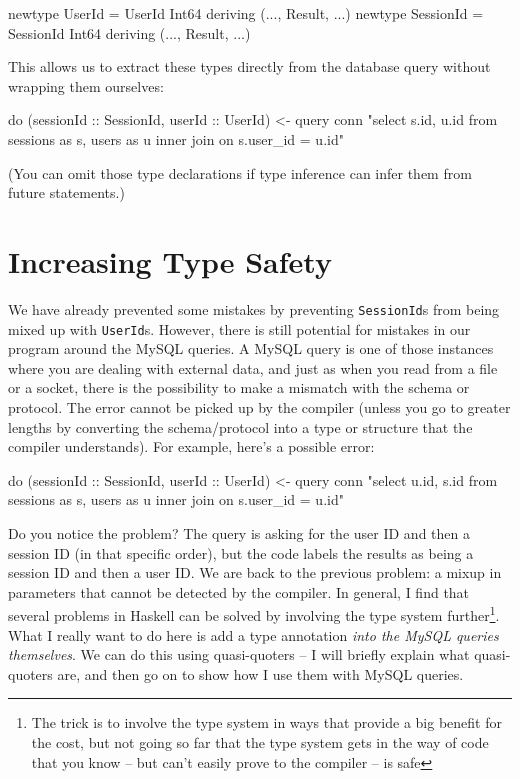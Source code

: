\documentclass{tmr}
\begin{document}
\begin{code}
newtype UserId = UserId Int64 deriving (..., Result, ...)
newtype SessionId = SessionId Int64 deriving (..., Result, ...)
\end{code}

This allows us to extract these types directly from the database query without wrapping them ourselves:

\begin{code}
do (sessionId :: SessionId, userId :: UserId) <- query conn "select
     s.id, u.id from sessions as s, users as u inner join on s.user_id = u.id"
\end{code}

(You can omit those type declarations if type inference can infer them from future statements.)

\section{Increasing Type Safety}

We have already prevented some mistakes by preventing \lstinline|SessionId|s from being mixed up with \lstinline|UserId|s.  However, there is still potential for mistakes in our program around the MySQL queries.  A MySQL query is one of those instances where you are dealing with external data, and just as when you read from a file or a socket, there is the possibility to make a mismatch with the schema or protocol.  The error cannot be picked up by the compiler (unless you go to greater lengths by converting the schema/protocol into a type or structure that the compiler understands).  For example, here's a possible error:

\begin{code}
do (sessionId :: SessionId, userId :: UserId) <- query conn "select
     u.id, s.id from sessions as s, users as u inner join on s.user_id = u.id"
\end{code}

Do you notice the problem?  The query is asking for the user ID and then a session ID (in that specific order), but the code labels the results as being a session ID and then a user ID\@.  We are back to the previous problem: a mixup in parameters that cannot be detected by the compiler.  In general, I find that several problems in Haskell can be solved by involving the type system further\footnote{The trick is to involve the type system in ways that provide a big benefit for the cost, but not going so far that the type system gets in the way of code that you know -- but can't easily prove to the compiler -- is safe}. What I really want to do here is add a type annotation \textit{into the MySQL queries themselves}.  We can do this using quasi-quoters -- I will briefly explain what quasi-quoters are, and then go on to show how I use them with MySQL queries. 
\end{document}
